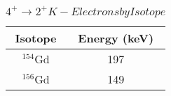 \begin{table}[]
    \centering
    \caption{$4^+\rightarrow2^+ K-Electrons by Isotope$}
    \begin{tabular}{c|c}
    \toprule
         Isotope & Energy (keV)  \\
         \hline
         $^{154}$Gd & 197 \\
         $^{156}$Gd & 149 
         \bottomrule
    \end{tabular}
    \label{tab:neutron_electron}
\end{table}
